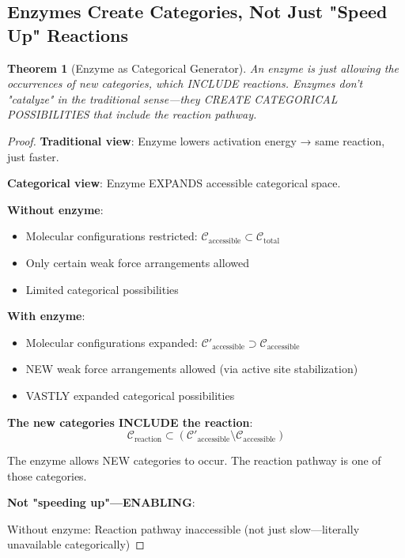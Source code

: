 \documentclass[12pt,a4paper]{article}
\newtheorem{theorem}{Theorem}[section]
\begin{document}
\subsection{Enzymes Create Categories, Not Just "Speed Up" Reactions}

\begin{theorem}[Enzyme as Categorical Generator]
\label{thm:enzyme_categorical_generator}
An enzyme is just allowing the occurrences of new categories, which INCLUDE reactions. Enzymes don't "catalyze" in the traditional sense—they CREATE CATEGORICAL POSSIBILITIES that include the reaction pathway.
\end{theorem}

\begin{proof}
\textbf{Traditional view}: Enzyme lowers activation energy → same reaction, just faster.

\textbf{Categorical view}: Enzyme EXPANDS accessible categorical space.

\textbf{Without enzyme}:
\begin{itemize}
\item Molecular configurations restricted: $\mathcal{C}_{\text{accessible}} \subset \mathcal{C}_{\text{total}}$
\item Only certain weak force arrangements allowed
\item Limited categorical possibilities
\end{itemize}

\textbf{With enzyme}:
\begin{itemize}
\item Molecular configurations expanded: $\mathcal{C}'_{\text{accessible}} \supset \mathcal{C}_{\text{accessible}}$
\item NEW weak force arrangements allowed (via active site stabilization)
\item VASTLY expanded categorical possibilities
\end{itemize}

\textbf{The new categories INCLUDE the reaction}:
\begin{equation}
\mathcal{C}_{\text{reaction}} \subset (\mathcal{C}'_{\text{accessible}} \setminus \mathcal{C}_{\text{accessible}})
\end{equation}

The enzyme allows NEW categories to occur. The reaction pathway is one of those categories.

\textbf{Not "speeding up"—ENABLING}:

Without enzyme: Reaction pathway inaccessible (not just slow—literally unavailable categorically)


\end{proof}
\end{document}
